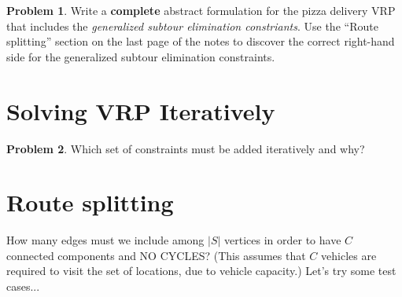 \documentclass[11pt]{article}
\theoremstyle{definition}
\newtheorem{problem}{Problem}
\newcommand{\answerbox}[3]{%
  \fbox{%
    \begin{minipage}[#1]{#2}
      \hfill\vspace{#3}
    \end{minipage}
  }
}
\newcommand{\answerboxfull}[2]{%
  \answerbox{#1}{6.38in}{#2} 
}
\begin{document}
\begin{problem}
Write a \textbf{complete} abstract formulation for the pizza delivery VRP that includes the \emph{generalized subtour elimination constriants}.  Use the ``Route splitting'' section on the last page of the notes to discover the correct right-hand side for the generalized subtour elimination constraints.\\
\answerboxfull{c}{10cm}
\end{problem}

\section{Solving VRP Iteratively}  
\begin{problem}Which set of constraints must be added iteratively and why?

\answerboxfull{c}{2cm}
\end{problem}

\section{Route splitting}

How many edges must we include among $|S|$ vertices in order to have $C$ connected components and NO CYCLES?  (This assumes that $C$ vehicles are required to visit the set of locations, due to vehicle capacity.)  Let's try some test cases...
\end{document}
